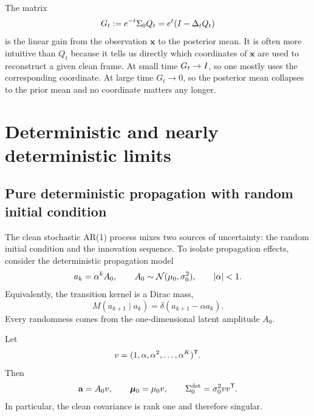 \documentclass[11pt]{article}
\begin{document}
The matrix
\begin{equation}\label{eq:gain_matrix_def}
 G_t:=e^{-t}\Sigma_0Q_t
 =e^t(I-\Delta_tQ_t)
\end{equation}
is the linear gain from the observation $\mathbf x$ to the posterior mean. It is often more intuitive than $Q_t$ because it tells us directly which coordinates of $\mathbf x$ are used to reconstruct a given clean frame. At small time $G_t\to I$, so one mostly uses the corresponding coordinate. At large time $G_t\to 0$, so the posterior mean collapses to the prior mean and no coordinate matters any longer.

\section{Deterministic and nearly deterministic limits}

\subsection{Pure deterministic propagation with random initial condition}

The clean stochastic AR(1) process mixes two sources of uncertainty: the random initial condition and the innovation sequence. To isolate propagation effects, consider the deterministic propagation model
\begin{equation}\label{eq:det_model}
 a_k=\alpha^kA_0,
 \qquad A_0\sim\mathcal{N}(\mu_0,\sigma_0^2),
 \qquad |\alpha|<1.
\end{equation}
Equivalently, the transition kernel is a Dirac mass,
\begin{equation}
 M(a_{k+1}\mid a_k)=\delta(a_{k+1}-\alpha a_k).
\end{equation}
Every randomness comes from the one-dimensional latent amplitude $A_0$.

\begin{proposition}
Let
\begin{equation}
 v=(1,\alpha,\alpha^2,\dots,\alpha^K)^{\mathsf{T}}.
\end{equation}
Then
\begin{equation}\label{eq:det_rank_one_cov}
 \mathbf a=A_0v,
 \qquad
 \boldsymbol\mu_0=\mu_0v,
 \qquad
 \Sigma_0^{\mathrm{det}}=\sigma_0^2vv^{\mathsf{T}}.
\end{equation}
In particular, the clean covariance is rank one and therefore singular.
\end{proposition}
\end{document}
